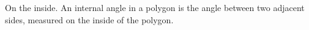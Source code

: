 On the inside. An internal angle in a polygon is the
angle between two adjacent sides, measured on the inside
of the polygon.